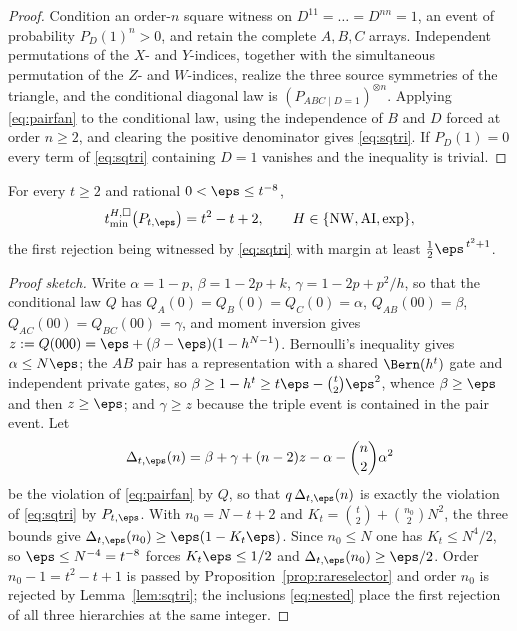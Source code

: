 \begin{proof}
Condition an order-$n$ square witness on $D^{11}=\dots=D^{nn}=1$, an event of probability $P_D(1)^n>0$, and retain the complete $A,B,C$ arrays. Independent permutations of the $X$- and $Y$-indices, together with the simultaneous permutation of the $Z$- and $W$-indices, realize the three source symmetries of the triangle, and the conditional diagonal law is $(P_{ABC\mid D=1})^{\otimes n}$. Applying \eqref{eq:pairfan} to the conditional law, using the independence of $B$ and $D$ forced at order $n\ge2$, and clearing the positive denominator gives \eqref{eq:sqtri}. If $P_D(1)=0$ every term of \eqref{eq:sqtri} containing $D=1$ vanishes and the inequality is trivial.
\end{proof}

\begin{theorem}\label{thm:rarefirstrejection}
For every $t\ge2$ and rational $0<\eps\le t^{-8}$,
\[
\tminsq H\bigl(P_{t,\eps}\bigr)=t^2-t+2,\qquad H\in\{\mathrm{NW},\mathrm{AI},\mathrm{exp}\},
\]
the first rejection being witnessed by \eqref{eq:sqtri} with margin at least $\tfrac12\eps^{\,t^2+1}$.
\end{theorem}

\begin{proof}[Proof sketch]
Write $\alpha=1-p$, $\beta=1-2p+k$, $\gamma=1-2p+p^2/h$, so that the conditional law $Q$ has $Q_A(0)=Q_B(0)=Q_C(0)=\alpha$, $Q_{AB}(00)=\beta$, $Q_{AC}(00)=Q_{BC}(00)=\gamma$, and moment inversion gives $z:=Q(000)=\eps+(\beta-\eps)(1-h^{N-1})$. Bernoulli's inequality gives $\alpha\le N\eps$; the $AB$ pair has a representation with a shared $\Bern(h^t)$ gate and independent private gates, so $\beta\ge1-h^t\ge t\eps-\binom t2\eps^2$, whence $\beta\ge\eps$ and then $z\ge\eps$; and $\gamma\ge z$ because the triple event is contained in the pair event. Let
\[
\Delta_{t,\eps}(n)=\beta+\gamma+(n-2)z-\alpha-\binom n2\alpha^2
\]
be the violation of \eqref{eq:pairfan} by $Q$, so that $q\,\Delta_{t,\eps}(n)$ is exactly the violation of \eqref{eq:sqtri} by $P_{t,\eps}$. With $n_0=N-t+2$ and $K_t=\binom t2+\binom{n_0}2N^2$, the three bounds give $\Delta_{t,\eps}(n_0)\ge\eps(1-K_t\eps)$. Since $n_0\le N$ one has $K_t\le N^4/2$, so $\eps\le N^{-4}=t^{-8}$ forces $K_t\eps\le1/2$ and $\Delta_{t,\eps}(n_0)\ge\eps/2$. Order $n_0-1=t^2-t+1$ is passed by Proposition~\ref{prop:rareselector} and order $n_0$ is rejected by Lemma~\ref{lem:sqtri}; the inclusions \eqref{eq:nested} place the first rejection of all three hierarchies at the same integer.
\end{proof}

